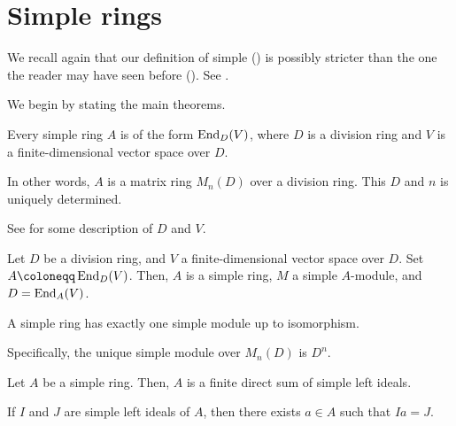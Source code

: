 \documentclass[12pt]{article}
\begin{document}

\section{Simple rings}

We recall again that our definition of simple () is possibly stricter than the one the reader may have seen before (). See .

We begin by stating the main theorems.

\begin{thm} \label{thm:simple-ring-is-matrix-ring}
	Every simple ring $A$ is of the form $\operatorname{End}_{D}(V)$, 
	where $D$ is a division ring and $V$ is a finite-dimensional vector space over $D$. 

	In other words, $A$ is a matrix ring $M_{n}(D)$ over a division ring. 
	This $D$ and $n$ is uniquely determined.
\end{thm}
See  for some description of $D$ and $V$.

\begin{thm}
	Let $D$ be a division ring, and $V$ a finite-dimensional vector space over $D$. Set $A \coloneqq \End_{D}(V)$. Then, $A$ is a simple ring, $M$ a simple $A$-module, and $D = \operatorname{End}_{A}(V)$.
\end{thm}

\begin{thm}
	A simple ring has exactly one simple module up to isomorphism.

	Specifically, the unique simple module over $M_{n}(D)$ is $D^{n}$.
\end{thm}

\begin{thm}
	Let $A$ be a simple ring. Then, $A$ is a finite direct sum of simple left ideals.

	If $I$ and $J$ are simple left ideals of $A$, then there exists $a \in A$ such that $Ia = J$.
\end{thm}
\end{document}
